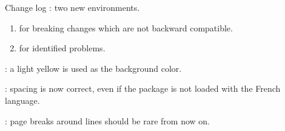 \documentclass[12pt, a4paper]{article}
\begin{document}
\begin{tdocnew}
	\item Change log : two new environments.
    \begin{enumerate}
        \item {} for breaking changes which are not backward compatible.

        \item {} for identified problems.
    \end{enumerate}

	\item {}: a light yellow is used as the background color.
\end{tdocnew}

\medskip

\begin{tdocfix}
	\item {}: spacing is now correct, even if the  package is not loaded with the French language.

	\item {}: page breaks around  lines should be rare from now on.
\end{tdocfix}
\end{document}
